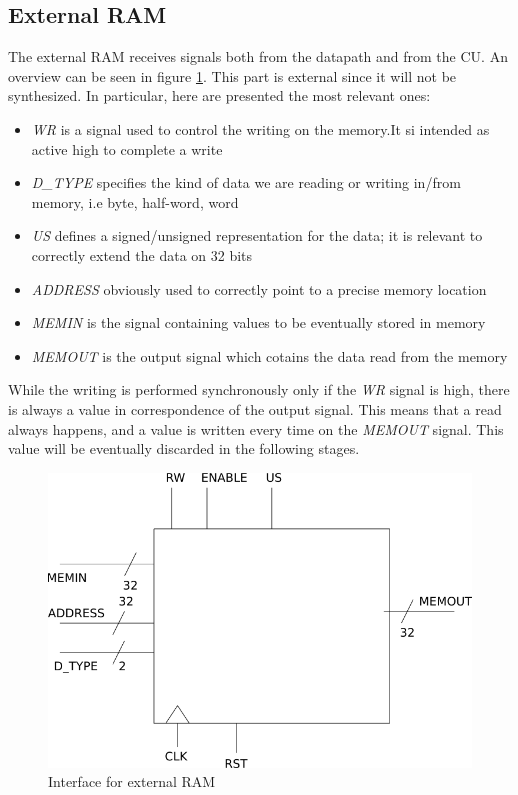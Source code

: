 \subsection{External RAM}
\label{ram}
The external RAM receives signals both from the datapath and from the CU. An overview can be seen in figure \ref{ext_ram_fig}. This part is external since it will not be synthesized. In particular, here are presented the most relevant ones:
\begin{itemize}
	\item \textit{WR} is a signal used to control the writing on the memory.It 
	si intended as active high to complete a write
	\item \textit{D\_TYPE} specifies the kind of data we are reading or writing in/from memory, i.e byte, half-word, word
	\item \textit{US} defines a signed/unsigned representation for the data; it is relevant to correctly extend the data on 32 bits
	\item \textit{ADDRESS} obviously used to correctly point to a precise memory location
	\item \textit{MEMIN} is the signal containing values to be eventually stored in memory
	\item \textit{MEMOUT} is the output signal which cotains the data read from the memory
\end{itemize}

While the writing is performed synchronously only if the \textit{WR} signal is 
high, there is always a value in correspondence of the output signal. This 
means that a read always happens, and a value is written every time on the 
\textit{MEMOUT} signal. This value will be eventually discarded in the 
following stages.

\begin{figure}
	\centering
	\includegraphics[scale=0.5]{chapters/figures/ram_ext}
	\caption{Interface for external RAM}
	\label{ext_ram_fig}
\end{figure} 
